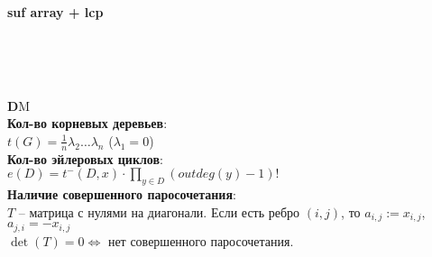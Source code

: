 \documentclass[a4paper,12pt]{article}
\begin{document}
\pagebreak
\inputminted[linenos, breaklines]{c++}{code/2chinese.cpp} \pagebreak
\inputminted[linenos, breaklines]{c++}{code/automaton.cpp} \pagebreak
\inputminted[linenos, breaklines]{c++}{code/automaton2.cpp} \pagebreak
\inputminted[linenos, breaklines]{c++}{code/discrete_log.cpp} \pagebreak
\inputminted[linenos, breaklines]{c++}{code/hungarian.cpp} \pagebreak
\inputminted[linenos, breaklines]{c++}{code/max_flow.cpp} \pagebreak
\inputminted[linenos, breaklines]{c++}{code/min_cost.cpp} \pagebreak
\inputminted[linenos, breaklines]{c++}{code/min_cyclic_shift.cpp}
\inputminted[linenos, breaklines]{c++}{code/sum_over_subsets.cpp}
 \pagebreak
\inputminted[linenos, breaklines]{c++}{code/strings.cpp} \pagebreak
\textbf{suf array + lcp}
\inputminted[linenos, breaklines]{c++}{code/suffmas-e-maxx.cpp} \pagebreak
\inputminted[linenos, breaklines]{c++}{code/kasai.cpp} \pagebreak
\pagebreak
\inputminted[linenos, breaklines]{c++}{code/prime_roots.cpp} \pagebreak
\inputminted[linenos, breaklines]{c++}{code/fft_sk.cpp}
\inputminted[linenos, breaklines]{c++}{code/fft_and_ds.cpp}
\pagebreak
{\textbf DM}\\

{\bf Кол-во корневых деревьев}:\\
$t(G)=\frac 1 n \lambda_2 \ldots \lambda_n$ ($\lambda_1=0$)\\

{\bf Кол-во эйлеровых циклов}:\\
$e(D)=t^-(D,x) \cdot \prod\limits_{y\in D} (outdeg(y)-1)!$\\

{\bf Наличие совершенного паросочетания}:\\
$T$ -- матрица с нулями на диагонали. Если есть ребро $(i, j)$, то $a_{i,j}:=x_{i,j}$, $a_{j,i}=-x_{i,j}$\\
$\det(T)=0 \Leftrightarrow$ нет совершенного паросочетания.\\
\end{document}
